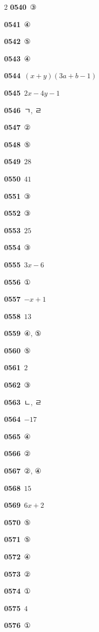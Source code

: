 \documentclass[10pt,a4paper]{article}
\begin{document}
\begin{multicols}{2}
\noindent\textbf{0540}\ ③\par
\noindent\textbf{0541}\ ④\par
\noindent\textbf{0542}\ ⑤\par
\noindent\textbf{0543}\ ④\par
\noindent\textbf{0544}\ $(x+y)(3a+b-1)$\par
\noindent\textbf{0545}\ $2x-4y-1$\par
\noindent\textbf{0546}\ ㄱ, ㄹ\par
\noindent\textbf{0547}\ ②\par
\noindent\textbf{0548}\ ⑤\par
\noindent\textbf{0549}\ $28$\par
\noindent\textbf{0550}\ $41$\par
\noindent\textbf{0551}\ ③\par
\noindent\textbf{0552}\ ③\par
\noindent\textbf{0553}\ $25$\par
\noindent\textbf{0554}\ ③\par
\noindent\textbf{0555}\ $3x-6$\par
\noindent\textbf{0556}\ ①\par
\noindent\textbf{0557}\ $-x+1$\par
\noindent\textbf{0558}\ $13$\par
\noindent\textbf{0559}\ ④, ⑤\par
\noindent\textbf{0560}\ ⑤\par
\noindent\textbf{0561}\ $2$\par
\noindent\textbf{0562}\ ③\par
\noindent\textbf{0563}\ ㄴ, ㄹ\par
\noindent\textbf{0564}\ $-17$\par
\noindent\textbf{0565}\ ④\par
\noindent\textbf{0566}\ ②\par
\noindent\textbf{0567}\ ②, ④\par
\noindent\textbf{0568}\ $15$\par
\noindent\textbf{0569}\ $6x+2$\par
\noindent\textbf{0570}\ ⑤\par
\noindent\textbf{0571}\ ⑤\par
\noindent\textbf{0572}\ ④\par
\noindent\textbf{0573}\ ②\par
\noindent\textbf{0574}\ ①\par
\noindent\textbf{0575}\ $4$\par
\noindent\textbf{0576}\ ①\par

\end{multicols}
\end{document}
